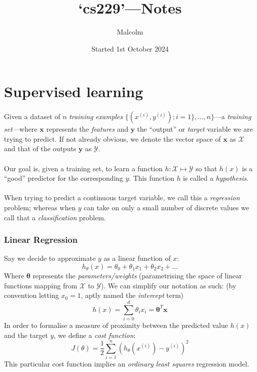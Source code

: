 \documentclass{report}
\title{`cs229'---Notes}
\date{Started 1st October 2024}
\author{Malcolm}
\begin{document}
\maketitle

\chapter{Supervised learning}
Given a dataset of $n$ \textit{training examples} $\{(x^{(i)},y^{(i)});i=1\},\ldots,n\}$---a \textit{training set}---where $\bm{x}$ 
represents the \textit{features} and $\bm{y}$ the ``output'' or \textit{target} variable we are trying to predict.
If not already obvious, we denote the vector space of $\bm{x}$ as $\mathcal{X}$ and that of the outputs $\bm{y}$ as 
$\mathcal{Y}$.\\
\vspace{1mm}\\
Our goal is, given a training set, to learn a function $h:\mathcal{X}\mapsto\mathcal{Y}$ so that $h(x)$ is a 
``good'' predictor for the corresponding $y$. This function $h$ is called a \textit{hypothesis}.\\
\vspace{1mm}\\
When trying to predict a continuous target variable, we call this a \textit{regression} problem; whereas when $y$
can take on only a small number of discrete values we call that a \textit{classification} problem.
\subsection{Linear Regression}
Say we decide to approximate $y$ as a linear function of $x$:
\begin{equation*}
h_\theta(x)=\theta_0+\theta_1x_1+\theta_2x_2+\ldots
\end{equation*}
Where $\bm{\theta}$ represents the \textit{parameters/weights} (parametrising the
space of linear functions mapping from $\mathcal{X}$ to $\mathcal{Y}$).
We can simplify our notation as such: (by convention letting $x_0=1$, aptly named the \textit{intercept} term)
\begin{equation*}
h(x)=\sum^d_{i=0}\theta_ix_i=\bm{\theta}^T\bm{x}
\end{equation*}
In order to formalise a measure of proximity between the predicted value $h(x)$ and the target $y$,
we define a \textit{cost function}:
\begin{equation*}
J(\theta)=\frac{1}{2}\sum^n_{i=1}(h_\theta(x^{(i)})-y^{(i)})^2
\end{equation*}
This particular cost function implies an \textit{ordinary least squares} regression model.
\newpage
\end{document}

